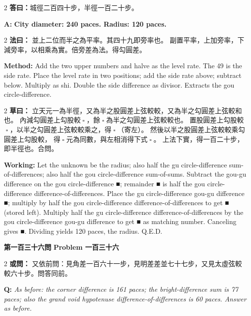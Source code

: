 \documentclass[11pt,a4paper]{article}
\let\origsquare\square
\renewcommand{\square}{\ensuremath{\origsquare}}%
\newcommand{\wen}[1]{%
  \par\vspace{0.5em}%
  \noindent\textcolor{problemcolor}{\textbf{第#1問}}%
  \hfill\textcolor{problemcolor}{\textbf{Problem #1}}\par\nopagebreak%
  \vspace{0.3em}%
}
\newcommand{\owen}[1]{%
  \noindent\textcolor{problemcolor}{\textbf{或問：}}{\tradfont #1}\par\nopagebreak%
}
\newcommand{\oweneng}[1]{%
  \noindent\textcolor{engcolor}{\textbf{Q: }}{\itshape #1}\par\nopagebreak%
}
\newcommand{\fayue}[1]{%
  \noindent\textcolor{methodcolor}{\textbf{法曰：}}{\tradfont #1}\par\nopagebreak%
}
\newcommand{\fayueeng}[1]{%
  \noindent\textcolor{engcolor}{\textbf{Method: }}{#1}\par\nopagebreak%
}
\newcommand{\tsaoyue}[1]{%
  \noindent\textcolor{workcolor}{\textbf{草曰：}}{\tradfont #1}\par%
}
\newcommand{\tsaoyueeng}[1]{%
  \noindent\textcolor{engcolor}{\textbf{Working: }}{\small #1}\par%
}
\newcommand{\dayue}[1]{%
  \noindent\textcolor{anscolor}{\textbf{答曰：}}{\tradfont #1}\par\nopagebreak%
}
\newcommand{\dayueeng}[1]{%
  \noindent\textcolor{engcolor}{\textbf{A: }}{\bfseries #1}\par\nopagebreak%
}
\begin{document}
\begin{paracol}{2}
\dayue{城徑二百四十步，半徑一百二十步。}
\switchcolumn
\dayueeng{City diameter: 240 paces. Radius: 120 paces.}
\end{paracol}

\begin{paracol}{2}
\fayue{%
並上二位而半之為平率。其四十九即旁率也。
副置平率，上加旁率，下減旁率，以相乘為實。倍旁差為法。得勾圓差。}
\switchcolumn
\fayueeng{%
Add the two upper numbers and halve as the level rate. The 49 is the side rate. Place the level rate in two positions; add the side rate above; subtract below. Multiply as shi. Double the side difference as divisor. Extracts the gou circle-difference.}
\end{paracol}

\begin{paracol}{2}
\tsaoyue{%
立天元一為半徑，又為半之股圓差上弦較較，又為半之勾圓差上弦較和也。
內減勾圓差上勾股較$ \; \square \; $，餘$ \; \square \; $為半之勾圓差上弦較較也。
置股圓差上勾股較$ \; \square \; $，以半之勾圓差上弦較較乘之，得$ \; \square \; $（寄左）。
然後以半之股圓差上弦較較乘勾圓差上勾股較，
得$ \; \square \; $元為同數，與左相消得下式$ \; \square \; $。
上法下實，得一百二十步，即半徑也。合問。}
\switchcolumn
\tsaoyueeng{%
Let the unknown be the radius; also half the gu circle-difference sum-of-differences; also half the gou circle-difference sum-of-sums. Subtract the gou-gu difference on the gou circle-difference ■; remainder ■ is half the gou circle-difference difference-of-differences. Place the gu circle-difference gou-gu difference ■; multiply by half the gou circle-difference difference-of-differences to get ■ (stored left). Multiply half the gu circle-difference difference-of-differences by the gou circle-difference gou-gu difference to get ■ as matching number. Canceling gives ■. Dividing yields 120 paces, the radius. Q.E.D.}
\end{paracol}

\vspace{0.5cm}

\wen{一百三十六}

\begin{paracol}{2}
\owen{%
又依前問：見角差一百六十一步，見明差差並七十七步，又見太虛弦較較六十步。問答同前。}
\switchcolumn
\oweneng{%
As before: the corner difference is 161 paces; the bright-difference sum is 77 paces; also the grand void hypotenuse difference-of-differences is 60 paces. Answer as before.}
\end{paracol}
\end{document}

